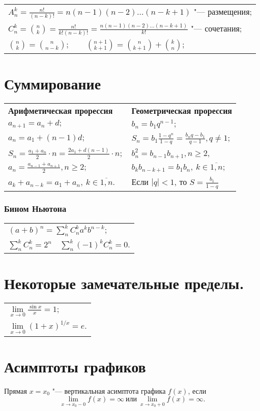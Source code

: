 \begin{longtable}[l]{l}
$A^k_n=\frac{n!}{(n-k)!}=n(n-1)(n-2)\dots(n-k+1)$ "--- размещения;
\\
$C^k_n=\binom{n}{k}=\frac{n!}{k!(n-k)!}=\frac{n(n-1)(n-2)\dots(n-k+1)}{k!}$ "--- сочетания;
\\
$\binom{n}{k}=\binom{n}{n-k};\qquad \binom{n+1}{k+1}=\binom{n}{k+1}+\binom{k}{n}; $
\end{longtable}

\section{Суммирование}
\begin{longtable}[l]{l l}
{\normalfont\normalsize\bfseries Арифметическая прорессия}
&
{\normalfont\normalsize\bfseries Геометрическая прорессия}
\\
$a_{n+1}=a_n+d;$ & $b_n=b_1 q^{n-1};$
\\
$a_n=a_1+(n-1)d;$ & $S_n=b_1\frac{1-q^n}{1-q}=\frac{b_n q-b_1}{q-1}, q\ne 1$;
\\ 
$S_n=\frac{a_1+a_n}{2}\cdot n=\frac{2a_1+d(n-1)}{2}\cdot n;$ & $b^2_n=b_{n-1}b_{n+1}, n\geq2,$
\\
$a_n=\frac{a_{n-1}+a_{n+1}}{2}, n\geq 2;$ & $b_kb_{n-k+1}=b_1b_n,\ k\in\overline{1,n};$
\\
$a_k+a_{n-k}=a_1+a_n,\ k\in\overline{1,n}.$ & Если $|q|<1$, то $S=\frac{b_1}{1-q}$
\end{longtable}

\subsubsection{Бином Ньютона}
\begin{longtable}[l]{l}
$(a+b)^n=\sum^{k}_n C^k_n a^k b^{n-k};$
\\
$\sum^{k}_n C^k_n=2^n \quad \sum^{k}_n (-1)^k C^k_n=0.$
\end{longtable}

\section{Некоторые замечательные пределы.}
\begin{longtable}[l]{l}
$\lim\limits_{x\to0}\frac{\sin x}{x}=1;$
\\
$\lim\limits_{x\to0} (1+x)^{1/x}=e.$
\end{longtable}

\section{Асимптоты графиков}
\textbullet \quad
Прямая $x=x_0$ "--- вертикальная асимптота графика $f(x)$, если $$\lim\limits_{x\to x_0-0}f(x)=\infty\ \text{или}\ \lim\limits_{x\to x_0+0}f(x)=\infty.$$ 

